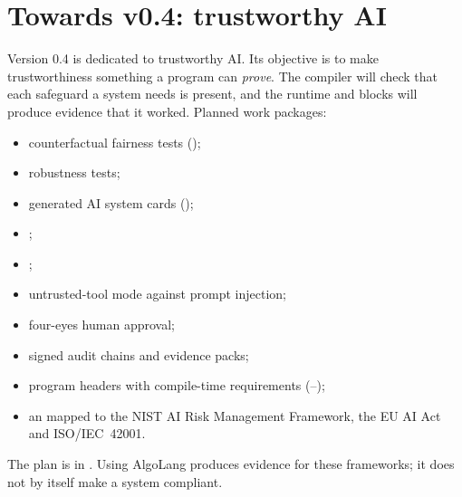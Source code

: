 \section{Towards v0.4: trustworthy AI}

Version 0.4 is dedicated to trustworthy AI. Its objective is to make trustworthiness something a program can \emph{prove}. The compiler will check that each safeguard a system needs is present, and the runtime and  blocks will produce evidence that it worked. Planned work packages:
\begin{itemize}
\item counterfactual fairness tests ();
\item robustness tests;
\item generated AI system cards ();
\item {};
\item {};
\item untrusted-tool mode against prompt injection;
\item four-eyes human approval;
\item signed audit chains and evidence packs;
\item {} program headers with compile-time requirements (--);
\item an  mapped to the NIST AI Risk Management Framework, the EU AI Act and ISO/IEC~42001.
\end{itemize}
The plan is in . Using AlgoLang produces evidence for these frameworks; it does not by itself make a system compliant.
